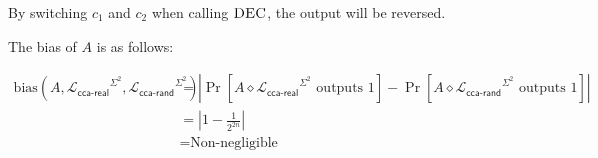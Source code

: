 \documentclass[12pt]{article}
\renewcommand{\L}{\ensuremath{\mathscr{L}}\xspace}
\newcommand{\lib}[1]{\ensuremath{\L_{\textsf{#1}}}\xspace}
\newcommand{\myterm}[1]{\ensuremath{\text{#1}}\xspace}
\newcommand{\bias}{\myterm{bias}}
\newcommand{\link}{\diamond}
\newcommand{\subname}[1]{\ensuremath{\textsc{#1}}\xspace}
\begin{document}
\noindent
By switching $c_1$ and $c_2$ when calling $\subname{DEC}$, the output
will be reversed. 

\noindent
The bias of $A$ is as follows:

\begin{align*}
    \bias(A,\lib{cca-real}^{\Sigma^2},\lib{cca-rand}^{\Sigma^2}) &=
    |\Pr[A \link \lib{cca-real}^{\Sigma^2} \mbox{ outputs 1}] - \Pr[A \link \lib{cca-rand}^{\Sigma^2} \mbox{ outputs 1}]| \\
    &= | 1 - \frac{1}{2^{2n}} | \\
    &= \text{Non-negligible}
\end{align*}
\end{document}
